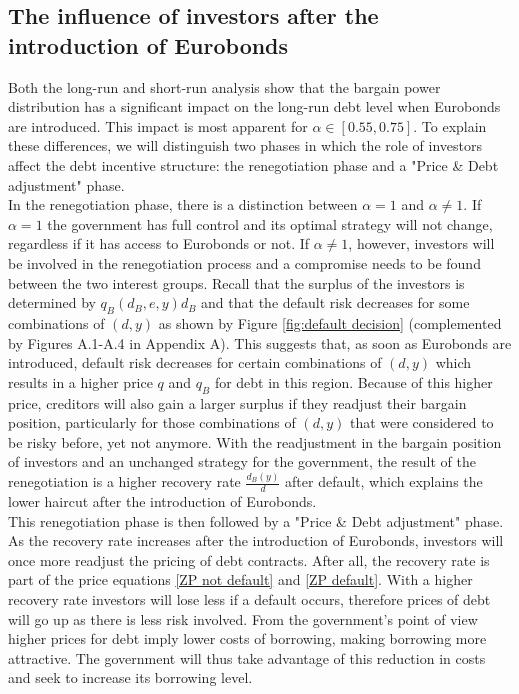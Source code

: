 \subsection{The influence of investors after the introduction of Eurobonds}
Both the long-run and short-run analysis show that the bargain power distribution has a significant impact on the long-run debt level when Eurobonds are introduced. This impact is most apparent for $\alpha \in [0.55,0.75]$. To explain these differences, we will distinguish two phases in which the role of investors affect the debt incentive structure: the renegotiation phase and a "Price \& Debt adjustment" phase.\\

 In the renegotiation phase, there is a distinction between $\alpha = 1$ and $\alpha \neq 1$. If $\alpha = 1$ the government has full control and its optimal strategy will not change, regardless if it has access to Eurobonds or not. If $\alpha \neq 1$, however, investors will be involved in the renegotiation process and a compromise needs to be found between the two interest groups. Recall that the surplus of the investors is determined by $q_B(d_B,e,y)d_B$ and that the default risk decreases for some combinations of $(d,y)$ as shown by Figure \ref{fig:default decision} (complemented by Figures A.1-A.4 in Appendix A). This suggests that, as soon as Eurobonds are introduced, default risk decreases for certain combinations of $(d,y)$ which results in a higher price $q$ and $q_B$ for debt in this region. Because of this higher price, creditors will also gain a larger surplus if they readjust their bargain position, particularly for those combinations of $(d,y)$ that were considered to be risky before, yet not anymore. With the readjustment in the bargain position of investors and an unchanged strategy for the government, the result of the renegotiation is a higher recovery rate $\frac{d_B(y)}{d}$ after default, which explains the lower haircut after the introduction of Eurobonds.\\ 
 
 This renegotiation phase is then followed by a "Price \& Debt adjustment" phase. As the recovery rate increases after the introduction of Eurobonds, investors will once more readjust the pricing of debt contracts. After all, the recovery rate is part of the price equations \eqref{ZP not default} and \eqref{ZP default}. With a higher recovery rate investors will lose less if a default occurs, therefore prices of debt will go up as there is less risk involved. From the government's point of view higher prices for debt imply lower costs of borrowing, making borrowing more attractive. The government will thus take advantage of this reduction in costs and seek to increase its borrowing level.\\
 
